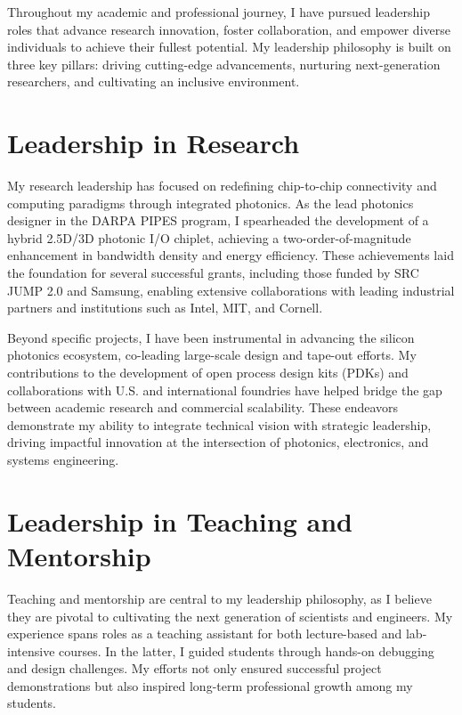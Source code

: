 Throughout my academic and professional journey, I have pursued leadership roles that advance research innovation, foster collaboration, and empower diverse individuals to achieve their fullest potential. My leadership philosophy is built on three key pillars: driving cutting-edge advancements, nurturing next-generation researchers, and cultivating an inclusive environment.

\section*{Leadership in Research}

My research leadership has focused on redefining chip-to-chip connectivity and computing paradigms through integrated photonics. As the lead photonics designer in the DARPA PIPES program, I spearheaded the development of a hybrid 2.5D/3D photonic I/O chiplet, achieving a two-order-of-magnitude enhancement in bandwidth density and energy efficiency. These achievements laid the foundation for several successful grants, including those funded by SRC JUMP 2.0 and Samsung, enabling extensive collaborations with leading industrial partners and institutions such as Intel, MIT, and Cornell.

Beyond specific projects, I have been instrumental in advancing the silicon photonics ecosystem, co-leading large-scale design and tape-out efforts. My contributions to the development of open process design kits (PDKs) and collaborations with U.S. and international foundries have helped bridge the gap between academic research and commercial scalability. These endeavors demonstrate my ability to integrate technical vision with strategic leadership, driving impactful innovation at the intersection of photonics, electronics, and systems engineering.

\section*{Leadership in Teaching and Mentorship}

Teaching and mentorship are central to my leadership philosophy, as I believe they are pivotal to cultivating the next generation of scientists and engineers. My experience spans roles as a teaching assistant for both lecture-based and lab-intensive courses. In the latter, I guided students through hands-on debugging and design challenges. My efforts not only ensured successful project demonstrations but also inspired long-term professional growth among my students.

